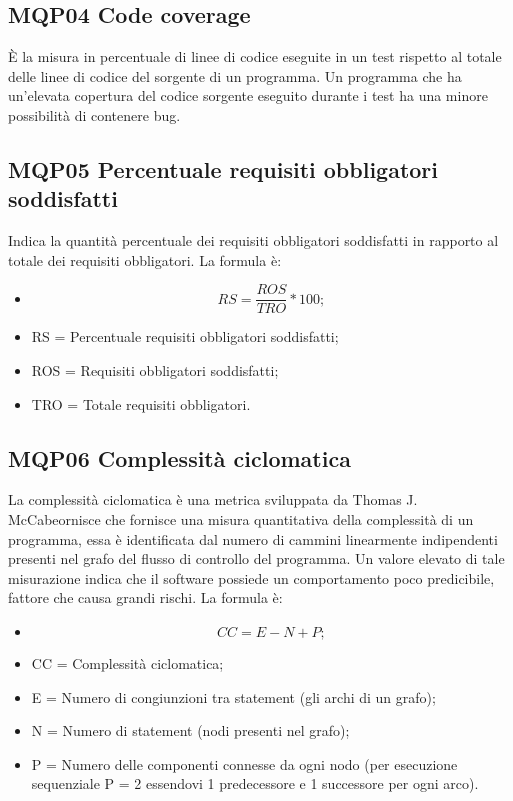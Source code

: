 \subsection{MQP04 Code coverage}
È la misura in percentuale di linee di codice eseguite in un test rispetto al totale delle linee di codice del sorgente di un programma. Un programma che ha un’elevata copertura del codice sorgente eseguito durante i test ha una minore possibilità di contenere bug.

\subsection{MQP05 Percentuale requisiti obbligatori soddisfatti}
Indica la quantità percentuale dei requisiti obbligatori soddisfatti in rapporto al totale dei requisiti obbligatori.
La formula è:
\begin{itemize}
  \item[] \[RS = \frac{ROS}{TRO} * 100;\]
  \item RS = Percentuale requisiti obbligatori soddisfatti;
  \item ROS = Requisiti obbligatori soddisfatti;
  \item TRO = Totale requisiti 	obbligatori.
  \end{itemize}


\subsection{MQP06 Complessità ciclomatica}
La complessità ciclomatica è una metrica sviluppata da Thomas J. McCabeornisce che fornisce una misura quantitativa della complessità di un programma, essa è identificata dal numero di cammini linearmente indipendenti presenti nel grafo del flusso di controllo del programma. Un valore elevato di tale misurazione indica che il software possiede un comportamento poco predicibile, fattore che causa grandi rischi.
La formula è:
\begin{itemize}
  \item[] \[CC 	= E - N + P;\]
  \item CC = Complessità ciclomatica;
  \item E = Numero di congiunzioni tra statement (gli archi di un grafo);
  \item N = Numero di statement (nodi presenti nel grafo);
  \item P = Numero delle componenti connesse da ogni nodo (per esecuzione sequenziale P = 2 essendovi 1 predecessore e 1 successore per ogni arco).
  \end{itemize}


